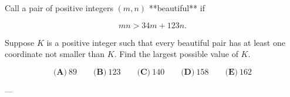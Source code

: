 Call a pair of positive integers \((m,n)\) **beautiful** if



\[
mn>34m+123n.
\]

Suppose \(K\) is a positive integer such that every beautiful pair has at least one coordinate not smaller than \(K\). Find the largest possible value of \(K\).



\[
\textbf{(A)}\ 89
\qquad
\textbf{(B)}\ 123
\qquad
\textbf{(C)}\ 140
\qquad
\textbf{(D)}\ 158
\qquad
\textbf{(E)}\ 162
\]

---
